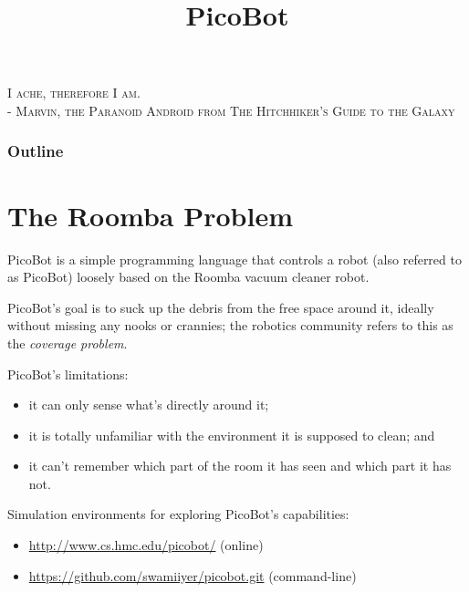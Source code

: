 \documentclass[8pt,a4paper,compress,handout]{beamer}
\title{PicoBot}
\date{}
\begin{document}
\begin{frame}
\begin{flushright}
\tiny \textsc{I ache, therefore I am. \\ - Marvin, the Paranoid Android from The Hitchhiker's Guide to the Galaxy}
\end{flushright}
\titlepage
\end{frame}

\begin{frame}
\frametitle{Outline}
\tableofcontents
\end{frame}

\section{The Roomba Problem}
\begin{frame}[fragile]
PicoBot is a simple programming language that controls a robot (also referred to as PicoBot) loosely based on the Roomba vacuum cleaner robot.

\bigskip

PicoBot's goal is to suck up the debris from the free space around it, ideally without missing any nooks or crannies; the robotics community refers to this as the \emph{coverage problem}.

\bigskip

PicoBot's limitations:
\begin{itemize}
\item it can only sense what's directly around it; 

\item it is totally unfamiliar with the environment it is supposed to clean; and 

\item it can't remember which part of the room it has seen and which part it has not.
\end{itemize}

\bigskip

Simulation environments for exploring PicoBot's capabilities:
\begin{itemize}
\item \href{http://www.cs.hmc.edu/picobot/}{http://www.cs.hmc.edu/picobot/} (online)

\item \href{https://github.com/swamiiyer/picobot.git}{https://github.com/swamiiyer/picobot.git} (command-line)
\end{itemize}
\end{frame}
\end{document}

